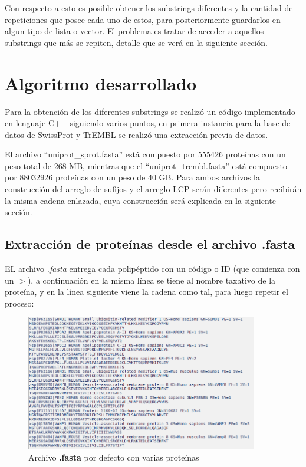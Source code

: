 Con respecto a esto es posible obtener los substrings diferentes y la cantidad de repeticiones que posee cada uno de estos, para posteriormente guardarlos en algun tipo de lista o vector. El problema es tratar de acceder a aquellos substrings que más se repiten, detalle que se verá en la siguiente sección.

\section{Algoritmo desarrollado}

Para la obtención de los diferentes substrings se realizó un código implementado en lenguaje C++ siguiendo varios puntos, en primera instancia para la base de datos de SwissProt y TrEMBL se realizó una extracción previa de datos.

El archivo ``uniprot\_sprot.fasta'' está compuesto por 555426 proteínas con un peso total de 268 MB, mientras que el ``uniprot\_trembl.fasta'' está compuesto por 88032926 proteínas con un peso de 40 GB. Para ambos archivos la construcción del arreglo de sufijos y el arreglo LCP serán diferentes pero recibirán la misma cadena enlazada, cuya construcción será explicada en la siguiente sección.

\subsection{Extracción de proteínas desde el archivo .fasta}

EL archivo \textit{.fasta} entrega cada polipéptido con un código o ID (que comienza con un $>$), a continuación en la misma línea se tiene al nombre taxativo de la proteína, y en la línea siguiente viene la cadena como tal, para luego repetir el proceso:

\begin{figure}[h]
    \centering
    \includegraphics[width=0.9\textwidth]{./images/fastadefecto.png}
    \caption{Archivo \textbf{.fasta} por defecto con varias proteínas}
    \label{fig:image5}
\end{figure}

